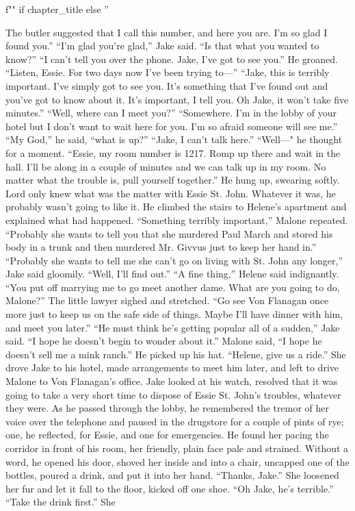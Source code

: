 \documentclass{novel}
\begin{document}
\begin{ChapterStart}
\vspace{3\nbs}
f"" if chapter_title else ''
\end{ChapterStart}

The butler suggested that I call this number, and here you are. I’m so glad I found you.” “I'm glad you’re glad,” Jake said. “Is that what you wanted to know?” “I can’t tell you over the phone. Jake, I’ve got to see you.” He groaned. “Listen, Essie. For two days now I've been trying to—” “Jake, this is terribly important. I’ve simply got to see you. It’s something that I’ve found out and you’ve got to know about it. It’s important, I tell you. Oh Jake, it won’t take five minutes.” “Well, where can I meet you?” “Somewhere. I’m in the lobby of your hotel but I don’t want to wait here for you. I’m so afraid someone will see me.” “My God,” he said, “what is up?” “Jake, I can’t talk here.” “Well—" he thought for a moment. “Essie, my room number is 1217. Romp up there and wait in the hall. I’ll be along in a couple of minutes and we can talk up in my room. No matter what the trouble is, pull yourself together.” He hung up, swearing softly. Lord only knew what was the matter with Essie St. John. Whatever it was, he probably wasn’t going to like it. He climbed the stairs to Helene’s apartment and explained what had happened. “Something terribly important,” Malone repeated. “Probably she wants to tell you that she murdered Paul March and stored his body in a trunk and then murdered Mr. Givvus just to keep her hand in.” “Probably she wants to tell me she can’t go on living with St. John any longer,” Jake said gloomily. “Well, I’ll find out.” “A fine thing,” Helene said indignantly. “You put off marrying me to go meet another dame. What are you going to do, Malone?” The little lawyer sighed and stretched. “Go see Von Flanagan once more just to keep us on the safe side of things. Maybe I’ll have dinner with him, and meet you later.” “He must think he’s getting popular all of a sudden,” Jake said. “I hope he doesn’t begin to wonder about it.” Malone said, “I hope he doesn’t sell me a mink ranch.” He picked up his hat. “Helene, give us a ride.” She drove Jake to his hotel, made arrangements to meet him later, and left to drive Malone to Von Flanagan’s office. Jake looked at his watch, resolved that it was going to take a very short time to dispose of Essie St. John’s troubles, whatever they were. As he passed through the lobby, he remembered the tremor of her voice over the telephone and paused in the drugstore for a couple of pints of rye; one, he reflected, for Essie, and one for emergencies. He found her pacing the corridor in front of his room, her friendly, plain face pale and strained. Without a word, he opened his door, shoved her inside and into a chair, uncapped one of the bottles, poured a drink, and put it into her hand. “Thanks, Jake.” She loosened her fur and let it fall to the floor, kicked off one shoe. “Oh Jake, he’s terrible.” “Take the drink first.” She 
\end{document}
